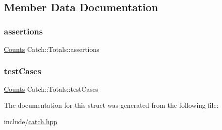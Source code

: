 \subsection{Member Data Documentation}
\mbox{\label{struct_catch_1_1_totals_a885ded66df752147b30c3d45aa602ec9}} 
\subsubsection{\texorpdfstring{assertions}{assertions}}
{\footnotesize\ttfamily \mbox{\hyperlink{struct_catch_1_1_counts}{Counts}} Catch\+::\+Totals\+::assertions}

\mbox{\label{struct_catch_1_1_totals_adb195fe477aedee2ecea88c888f16506}} 
\subsubsection{\texorpdfstring{test\+Cases}{testCases}}
{\footnotesize\ttfamily \mbox{\hyperlink{struct_catch_1_1_counts}{Counts}} Catch\+::\+Totals\+::test\+Cases}



The documentation for this struct was generated from the following file\+:\begin{DoxyCompactItemize}
\item 
include/\mbox{\hyperlink{catch_8hpp}{catch.\+hpp}}\end{DoxyCompactItemize}
